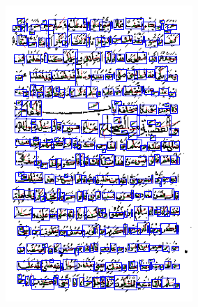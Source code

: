 \documentclass[conference,a4paper,twocolumn]{IEEEtran}
\begin{document}
\begin{figure}
\begin{minipage}{.30\linewidth}
  \includegraphics[width=\linewidth]{figures/patches_example_connected_components.png}
  \label{img2}
\end{minipage}
\end{figure}
\end{document}
